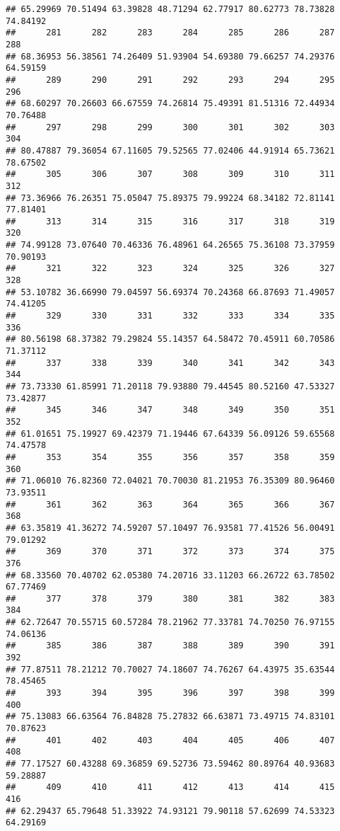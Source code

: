 \documentclass[
]{article}
\begin{document}
\begin{verbatim}
## 65.29969 70.51494 63.39828 48.71294 62.77917 80.62773 78.73828 74.84192 
##      281      282      283      284      285      286      287      288 
## 68.36953 56.38561 74.26409 51.93904 54.69380 79.66257 74.29376 64.59159 
##      289      290      291      292      293      294      295      296 
## 68.60297 70.26603 66.67559 74.26814 75.49391 81.51316 72.44934 70.76488 
##      297      298      299      300      301      302      303      304 
## 80.47887 79.36054 67.11605 79.52565 77.02406 44.91914 65.73621 78.67502 
##      305      306      307      308      309      310      311      312 
## 73.36966 76.26351 75.05047 75.89375 79.99224 68.34182 72.81141 77.81401 
##      313      314      315      316      317      318      319      320 
## 74.99128 73.07640 70.46336 76.48961 64.26565 75.36108 73.37959 70.90193 
##      321      322      323      324      325      326      327      328 
## 53.10782 36.66990 79.04597 56.69374 70.24368 66.87693 71.49057 74.41205 
##      329      330      331      332      333      334      335      336 
## 80.56198 68.37382 79.29824 55.14357 64.58472 70.45911 60.70586 71.37112 
##      337      338      339      340      341      342      343      344 
## 73.73330 61.85991 71.20118 79.93880 79.44545 80.52160 47.53327 73.42877 
##      345      346      347      348      349      350      351      352 
## 61.01651 75.19927 69.42379 71.19446 67.64339 56.09126 59.65568 74.47578 
##      353      354      355      356      357      358      359      360 
## 71.06010 76.82360 72.04021 70.70030 81.21953 76.35309 80.96460 73.93511 
##      361      362      363      364      365      366      367      368 
## 63.35819 41.36272 74.59207 57.10497 76.93581 77.41526 56.00491 79.01292 
##      369      370      371      372      373      374      375      376 
## 68.33560 70.40702 62.05380 74.20716 33.11203 66.26722 63.78502 67.77469 
##      377      378      379      380      381      382      383      384 
## 62.72647 70.55715 60.57284 78.21962 77.33781 74.70250 76.97155 74.06136 
##      385      386      387      388      389      390      391      392 
## 77.87511 78.21212 70.70027 74.18607 74.76267 64.43975 35.63544 78.45465 
##      393      394      395      396      397      398      399      400 
## 75.13083 66.63564 76.84828 75.27832 66.63871 73.49715 74.83101 70.87623 
##      401      402      403      404      405      406      407      408 
## 77.17527 60.43288 69.36859 69.52736 73.59462 80.89764 40.93683 59.28887 
##      409      410      411      412      413      414      415      416 
## 62.29437 65.79648 51.33922 74.93121 79.90118 57.62699 74.53323 64.29169 

\end{verbatim}
\end{document}
